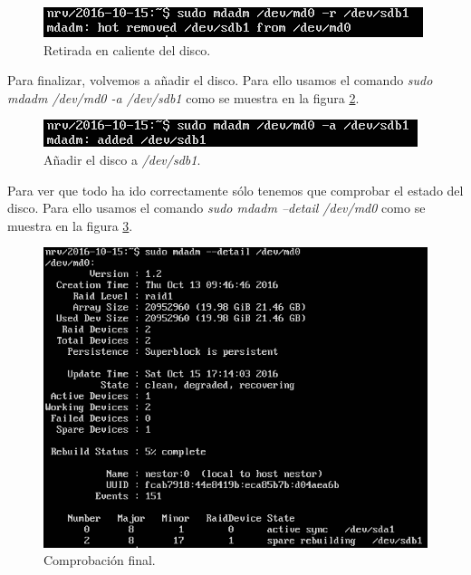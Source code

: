 \documentclass[a4paper,titlepage,12pt]{scrartcl}	%
\numberwithin{figure}{section} %
\numberwithin{table}{section} %
\begin{document}
	\begin{figure}[H]
		\includegraphics[width=\linewidth]{./Imagenes/ComprobarRAID3.png}
		\vspace{-0.5cm}
		\caption[Retirada en caliente del disco.]{Retirada en caliente del disco.}
		\label{comprobacionRAID3}
	\end{figure}
	
	Para finalizar, volvemos a añadir el disco. Para ello usamos el comando \textit{sudo mdadm /dev/md0 -a /dev/sdb1} como se muestra en la figura \ref{comprobacionRAID4}.
	
	\begin{figure}[H]
		\includegraphics[width=\linewidth]{./Imagenes/ComprobarRAID4.png}
		\vspace{-0.5cm}
		\caption[Añadir el disco a \textit{/dev/sdb1}.]{Añadir el disco a \textit{/dev/sdb1}.}
		\label{comprobacionRAID4}
	\end{figure}
	
	Para ver que todo ha ido correctamente sólo tenemos que comprobar el estado del disco. Para ello usamos el comando \textit{sudo mdadm --detail /dev/md0} como se muestra en la figura \ref{comprobacionRAID5}.
	
	\begin{figure}[H]
		\centering
		\includegraphics[scale=0.73]{./Imagenes/ComprobarRAID5.png}
		\caption[Comprobación final.]{Comprobación final.}
		\label{comprobacionRAID5}
	\end{figure}
	
\end{document}
